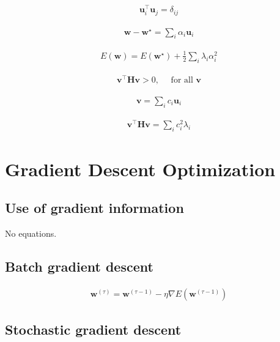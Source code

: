 \documentclass{article}
\begin{document}
\begin{align*}
\mathbf{u}_{i}^{\top} \mathbf{u}_{j}=\delta_{i j}
\tag{7.9}
\end{align*}

\begin{align*}
\mathbf{w}-\mathbf{w}^{\star}=\sum_{i} \alpha_{i} \mathbf{u}_{i}
\tag{7.10}
\end{align*}

\begin{align*}
E(\mathbf{w})=E\left(\mathbf{w}^{\star}\right)+\frac{1}{2} \sum_{i} \lambda_{i} \alpha_{i}^{2}
\tag{7.11}
\end{align*}

\begin{align*}
\mathbf{v}^{\top} \mathbf{H} \mathbf{v}>0, \quad \text{ for all } \mathbf{v}
\tag{7.12}
\end{align*}

\begin{align*}
\mathbf{v}=\sum_{i} c_{i} \mathbf{u}_{i}
\tag{7.13}
\end{align*}

\begin{align*}
\mathbf{v}^{\top} \mathbf{H} \mathbf{v}=\sum_{i} c_{i}^{2} \lambda_{i}
\tag{7.14}
\end{align*}

\section{Gradient Descent Optimization}

\subsection{Use of gradient information}

No equations.

\subsection{Batch gradient descent}

\begin{align*}
\mathbf{w}^{(\tau)}=\mathbf{w}^{(\tau-1)}-\eta \nabla E\left(\mathbf{w}^{(\tau-1)}\right)
\tag{7.16}
\end{align*}

\subsection{Stochastic gradient descent}
\end{document}

